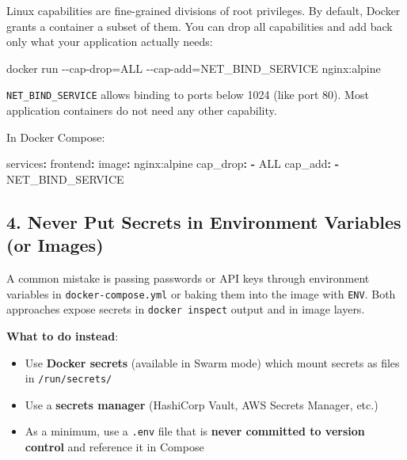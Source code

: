 \documentclass[11pt,american,a4paper,]{book}
\providecommand{\tightlist}{%
  \setlength{\itemsep}{2pt}\setlength{\parskip}{0pt}}
\newenvironment{Shaded}{}{}
\newcommand{\AttributeTok}[1]{\textcolor[rgb]{0.49,0.56,0.16}{#1}}
\newcommand{\FunctionTok}[1]{\textcolor[rgb]{0.02,0.16,0.49}{#1}}
\newcommand{\KeywordTok}[1]{\textcolor[rgb]{0.00,0.44,0.13}{\textbf{#1}}}
\newcommand{\NormalTok}[1]{#1}
\begin{document}
Linux capabilities are fine-grained divisions of root privileges. By
default, Docker grants a container a subset of them. You can drop all
capabilities and add back only what your application actually needs:

\begin{Shaded}
\begin{Highlighting}[]
\NormalTok{docker run {-}{-}cap{-}drop=ALL {-}{-}cap{-}add=NET\_BIND\_SERVICE nginx:alpine}
\end{Highlighting}
\end{Shaded}

\texttt{NET\_BIND\_SERVICE} allows binding to ports below 1024 (like
port 80). Most application containers do not need any other capability.

In Docker Compose:

\begin{Shaded}
\begin{Highlighting}[]
\FunctionTok{services}\KeywordTok{:}
\AttributeTok{  }\FunctionTok{frontend}\KeywordTok{:}
\AttributeTok{    }\FunctionTok{image}\KeywordTok{:}\AttributeTok{ nginx:alpine}
\AttributeTok{    }\FunctionTok{cap\_drop}\KeywordTok{:}
\AttributeTok{      }\KeywordTok{{-}}\AttributeTok{ ALL}
\AttributeTok{    }\FunctionTok{cap\_add}\KeywordTok{:}
\AttributeTok{      }\KeywordTok{{-}}\AttributeTok{ NET\_BIND\_SERVICE}
\end{Highlighting}
\end{Shaded}

\subsection{4. Never Put Secrets in Environment Variables (or
Images)}\label{never-put-secrets-in-environment-variables-or-images}

A common mistake is passing passwords or API keys through environment
variables in \texttt{docker-compose.yml} or baking them into the image
with \texttt{ENV}. Both approaches expose secrets in
\texttt{docker\ inspect} output and in image layers.

\textbf{What to do instead}:

\begin{itemize}
\tightlist
\item
  Use \textbf{Docker secrets} (available in Swarm mode) which mount
  secrets as files in \texttt{/run/secrets/}
\item
  Use a \textbf{secrets manager} (HashiCorp Vault, AWS Secrets Manager,
  etc.)
\item
  As a minimum, use a \texttt{.env} file that is \textbf{never committed
  to version control} and reference it in Compose
\end{itemize}
\end{document}
